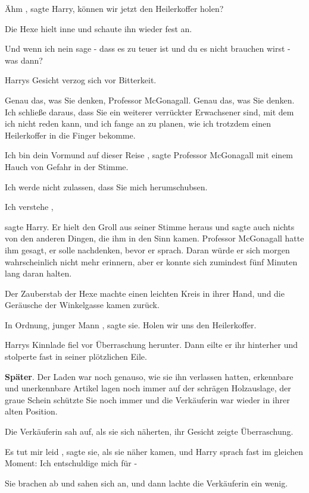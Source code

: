 \glqq Ähm\grqq{} , sagte Harry, \glqq können wir jetzt den Heilerkoffer
holen?\grqq{}

Die Hexe hielt inne und schaute ihn wieder fest an.

\glqq Und wenn ich nein sage - dass es zu teuer ist und du es nicht brauchen
wirst - was dann?\grqq{}

Harrys Gesicht verzog sich vor Bitterkeit.

\glqq Genau das, was Sie denken, Professor McGonagall. Genau das, was Sie
denken. Ich schließe daraus, dass Sie ein weiterer verrückter Erwachsener
sind, mit dem ich nicht reden kann, und ich fange an zu planen, wie ich
trotzdem einen Heilerkoffer in die Finger bekomme.\grqq{}

\glqq Ich bin dein Vormund auf dieser Reise\grqq{} , sagte Professor McGonagall
mit einem Hauch von Gefahr in der Stimme.

\glqq Ich werde nicht zulassen, dass Sie mich herumschubsen.\grqq{}

\glqq Ich verstehe\grqq{} ,

sagte Harry. Er hielt den Groll aus seiner Stimme heraus und sagte auch nichts
von den anderen Dingen, die ihm in den Sinn kamen. Professor McGonagall
hatte ihm gesagt, er solle nachdenken, bevor er sprach. Daran würde er sich
morgen wahrscheinlich nicht mehr erinnern, aber er konnte sich zumindest
fünf Minuten lang daran halten.

Der Zauberstab der Hexe machte einen leichten Kreis in ihrer Hand, und die
Geräusche der Winkelgasse kamen zurück.

\glqq In Ordnung, junger Mann\grqq{} , sagte sie. \glqq Holen wir uns den
Heilerkoffer.\grqq{}

Harrys Kinnlade fiel vor Überraschung herunter. Dann eilte er ihr hinterher und
stolperte fast in seiner plötzlichen Eile.

\textbf{Später}. Der Laden war noch genauso, wie sie ihn verlassen
hatten, erkennbare und unerkennbare Artikel lagen noch immer auf der schrägen
Holzauslage, der graue Schein schützte Sie noch immer und die Verkäuferin war
wieder in ihrer alten Position.

Die Verkäuferin sah auf, als sie sich näherten, ihr Gesicht zeigte Überraschung.

\glqq Es tut mir leid\grqq{} , sagte sie, als sie näher kamen, und Harry sprach
fast im gleichen Moment: \glqq Ich entschuldige mich für -\grqq{}

Sie brachen ab und sahen sich an, und dann lachte die Verkäuferin ein wenig.

